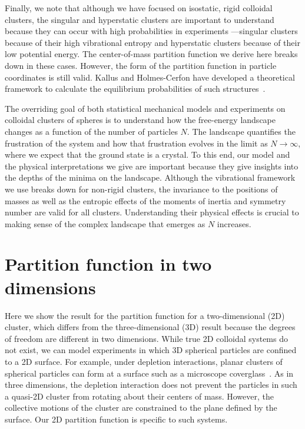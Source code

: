 \documentclass[pre, aps, twocolumn, reprint, amsmath,amssymb, showpacs,
superscriptaddress] {revtex4-1}
\begin{document}
Finally, we note that although we have focused on isostatic, rigid
colloidal clusters, the singular and hyperstatic clusters are important
to understand because they can occur with high probabilities in
experiments \cite{meng10}---singular clusters because of their high
vibrational entropy and hyperstatic clusters because of their low
potential energy. The center-of-mass partition function we derive here
breaks down in these cases. However, the form of the partition function
in particle coordinates is still valid. Kallus and Holmes-Cerfon have
developed a theoretical framework to calculate the equilibrium
probabilities of such structures~\cite{kallus_free_2017}.

The overriding goal of both statistical mechanical models and
experiments on colloidal clusters of spheres is to understand how the
free-energy landscape changes as a function of the number of particles
$N$. The landscape quantifies the frustration of the system and how that
frustration evolves in the limit as $N\to\infty$, where we expect that
the ground state is a crystal. To this end, our model and the physical
interpretations we give are important because they give insights into
the depths of the minima on the landscape. Although the vibrational
framework we use breaks down for non-rigid clusters, the invariance to
the positions of masses as well as the entropic effects of the moments
of inertia and symmetry number are valid for all clusters. Understanding
their physical effects is crucial to making sense of the complex
landscape that emerges as $N$ increases.

\appendix*
\section{Partition function in two dimensions}

Here we show the result for the partition function for a two-dimensional
(2D) cluster, which differs from the three-dimensional (3D) result
because the degrees of freedom are different in two dimensions. While
true 2D colloidal systems do not exist, we can model experiments in
which 3D spherical particles are confined to a 2D surface. For example,
under depletion interactions, planar clusters of spherical particles can
form at a surface such as a microscope
coverglass~\cite{perry_two-dimensional_2015}. As in three dimensions,
the depletion interaction does not prevent the particles in such a
quasi-2D cluster from rotating about their centers of mass. However, the
collective motions of the cluster are constrained to the plane defined
by the surface. Our 2D partition function is specific to such systems.
\end{document}
